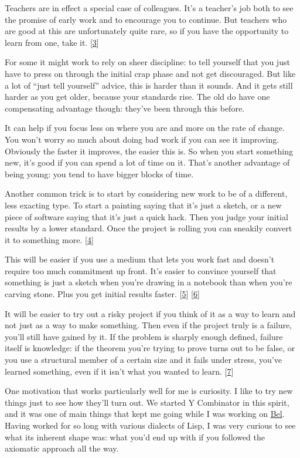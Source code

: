 Teachers are in effect a special case of colleagues. It's a teacher's
job both to see the promise of early work and to encourage you to
continue. But teachers who are good at this are unfortunately quite
rare, so if you have the opportunity to learn from one, take it.
{[}\hyperref[f3n]{3}{]}

For some it might work to rely on sheer discipline: to tell yourself
that you just have to press on through the initial crap phase and not
get discouraged. But like a lot of ``just tell yourself'' advice, this
is harder than it sounds. And it gets still harder as you get older,
because your standards rise. The old do have one compensating advantage
though: they've been through this before.

It can help if you focus less on where you are and more on the rate of
change. You won't worry so much about doing bad work if you can see it
improving. Obviously the faster it improves, the easier this is. So when
you start something new, it's good if you can spend a lot of time on it.
That's another advantage of being young: you tend to have bigger blocks
of time.

Another common trick is to start by considering new work to be of a
different, less exacting type. To start a painting saying that it's just
a sketch, or a new piece of software saying that it's just a quick hack.
Then you judge your initial results by a lower standard. Once the
project is rolling you can sneakily convert it to something more.
{[}\hyperref[f4n]{4}{]}

This will be easier if you use a medium that lets you work fast and
doesn't require too much commitment up front. It's easier to convince
yourself that something is just a sketch when you're drawing in a
notebook than when you're carving stone. Plus you get initial results
faster. {[}\hyperref[f5n]{5}{]} {[}\hyperref[f6n]{6}{]}

It will be easier to try out a risky project if you think of it as a way
to learn and not just as a way to make something. Then even if the
project truly is a failure, you'll still have gained by it. If the
problem is sharply enough defined, failure itself is knowledge: if the
theorem you're trying to prove turns out to be false, or you use a
structural member of a certain size and it fails under stress, you've
learned something, even if it isn't what you wanted to learn.
{[}\hyperref[f7n]{7}{]}

One motivation that works particularly well for me is curiosity. I like
to try new things just to see how they'll turn out. We started Y
Combinator in this spirit, and it was one of main things that kept me
going while I was working on \href{bel.html}{Bel}. Having worked for so
long with various dialects of Lisp, I was very curious to see what its
inherent shape was: what you'd end up with if you followed the axiomatic
approach all the way.

